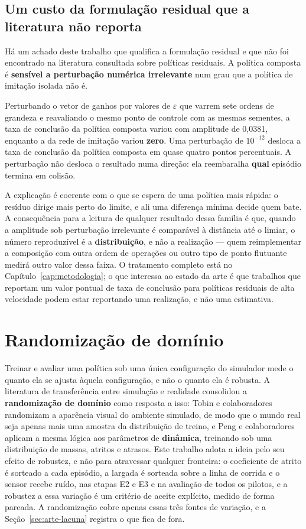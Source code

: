 \subsection{Um custo da formulação residual que a literatura não reporta}

Há um achado deste trabalho que qualifica a formulação residual e que não foi
encontrado na literatura consultada sobre políticas residuais. A política
composta é \textbf{sensível a perturbação numérica irrelevante} num grau que a
política de imitação isolada não é.

Perturbando o vetor de ganhos por valores de $\varepsilon$ que varrem sete ordens
de grandeza e reavaliando o mesmo ponto de controle com as mesmas sementes, a
taxa de conclusão da política composta variou com amplitude de 0,0381, enquanto a
da rede de imitação variou \textbf{zero}. Uma perturbação de $10^{-12}$ desloca a
taxa de conclusão da política composta em quase quatro pontos percentuais. A
perturbação não desloca o resultado numa direção: ela reembaralha \textbf{qual}
episódio termina em colisão.

A explicação é coerente com o que se espera de uma política mais rápida: o
resíduo dirige mais perto do limite, e ali uma diferença mínima decide quem bate.
A consequência para a leitura de qualquer resultado dessa família é que, quando a
amplitude sob perturbação irrelevante é comparável à distância até o limiar, o
número reproduzível é a \textbf{distribuição}, e não a realização --- quem
reimplementar a composição com outra ordem de operações ou outro tipo de ponto
flutuante medirá outro valor dessa faixa. O tratamento completo está no
Capítulo~\ref{cap:metodologia}; o que interessa ao estado da arte é que trabalhos
que reportam um valor pontual de taxa de conclusão para políticas residuais de
alta velocidade podem estar reportando uma realização, e não uma estimativa.

\section{Randomização de domínio}\label{sec:arte-rand}

Treinar e avaliar uma política sob uma única configuração do simulador mede o
quanto ela se ajusta àquela configuração, e não o quanto ela é robusta. A
literatura de transferência entre simulação e realidade consolidou a
\textbf{randomização de domínio} como resposta a isso: Tobin e colaboradores
\cite{Tobin2017DomainRand} randomizam a aparência visual do ambiente simulado,
de modo que o mundo real seja apenas mais uma amostra da distribuição de treino,
e Peng e colaboradores \cite{Peng2018DynamicsRand} aplicam a mesma lógica aos
parâmetros de \textbf{dinâmica}, treinando sob uma distribuição de massas,
atritos e atrasos. Este trabalho adota a ideia pelo seu efeito de robustez, e
não para atravessar qualquer fronteira: o coeficiente de atrito é sorteado a
cada episódio, a largada é sorteada sobre a linha de corrida e o sensor recebe
ruído, nas etapas E2 e E3 e na avaliação de todos os pilotos, e a robustez a
essa variação é um critério de aceite explícito, medido de forma pareada. A
randomização cobre apenas essas três fontes de variação, e a Seção~\ref{sec:arte-lacuna}
registra o que fica de fora.

